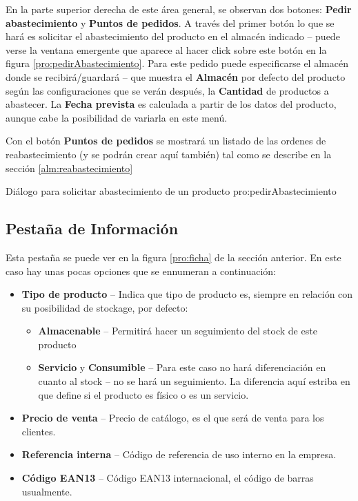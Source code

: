 En la parte superior derecha de este área general, se observan dos botones: \textbf{Pedir abastecimiento} y \textbf{Puntos de pedidos}. A través del primer botón lo que se hará es solicitar el abastecimiento del producto en el almacén indicado -- puede verse la ventana emergente que aparece al hacer click sobre este botón en la figura \ref{pro:pedirAbastecimiento}. Para este pedido puede especificarse el almacén donde se recibirá/guardará -- que muestra el \textbf{Almacén} por defecto del producto según las configuraciones que se verán después, la \textbf{Cantidad} de productos a abastecer. La \textbf{Fecha prevista} es calculada a partir de los datos del producto, aunque cabe la posibilidad de variarla en este menú.

Con el botón \textbf{Puntos de pedidos} se mostrará un listado de las ordenes de reabastecimiento (y se podrán crear aquí también) tal como se describe en la sección \ref{alm:reabastecimiento}

{Diálogo para solicitar abastecimiento de un producto}
{pro:pedirAbastecimiento}

\subsection{Pestaña de Información}
Esta pestaña se puede ver en la figura \ref{pro:ficha} de la sección anterior. En este caso hay unas pocas opciones que se ennumeran a continuación:

\begin{itemize}
  \item \textbf{Tipo de producto} -- Indica que tipo de producto es, siempre en relación con su posibilidad de stockage, por defecto:
    \begin{itemize}
      \item \textbf{Almacenable} -- Permitirá hacer un seguimiento del stock de este producto
      \item \textbf{Servicio} y \textbf{Consumible} -- Para este caso no hará diferenciación en cuanto al stock -- no se hará un 
                   seguimiento. La diferencia aquí estriba en que define si el producto es físico o es un servicio.
     \end{itemize}
  \item \textbf{Precio de venta} -- Precio de catálogo, es el que será de venta para los clientes.
  \item \textbf{Referencia interna} -- Código de referencia de uso interno en la empresa.
  \item \textbf{Código EAN13} -- Código EAN13 internacional, el código de barras usualmente.
\end{itemize}

